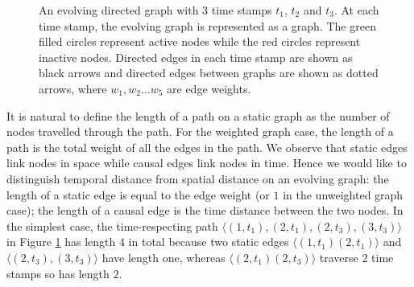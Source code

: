 \documentclass[12pt]{article}
\theoremstyle{definition}
\begin{document}
\begin{figure}[h]
 \begin{center}
\end{center}
\caption{An evolving directed graph with 3 time stamps $t_1$, $t_2$ and $t_3$.
At each time stamp, the evolving graph is represented as a graph.
The green filled circles represent active nodes while the red circles represent
inactive nodes. Directed edges in each time stamp are shown as black arrows and directed edges between graphs are shown as dotted arrows, where $w_1, w_2 \ldots w_5$ are edge weights.}
\label{fig:eg_shortest_path}
\end{figure}

It is natural to define the length of a path on a static graph as the number of nodes travelled through the path. For the weighted graph case, the length of a path is the total weight of all the edges in the path. We observe that static edges link nodes in space while causal edges link nodes in time. Hence we would like to distinguish temporal distance from spatial distance on an evolving graph: the length of a static edge is equal to the edge weight (or $1$ in the unweighted graph case); the length of a causal edge is the time distance between the two nodes. In the simplest case, the time-respecting path
$\langle (1, t_1) ,(2, t_1) , (2, t_3), (3, t_3)\rangle$ in Figure \ref{fig:eg_shortest_path} has length $4$ in total because two static edges $\langle (1, t_1) (2, t_1) \rangle$ and $\langle (2, t_3), (3, t_3) \rangle$ have length one, whereas $\langle (2, t_1) (2, t_3) \rangle$ traverse $2$ time stamps so has length $2$.
\end{document}
